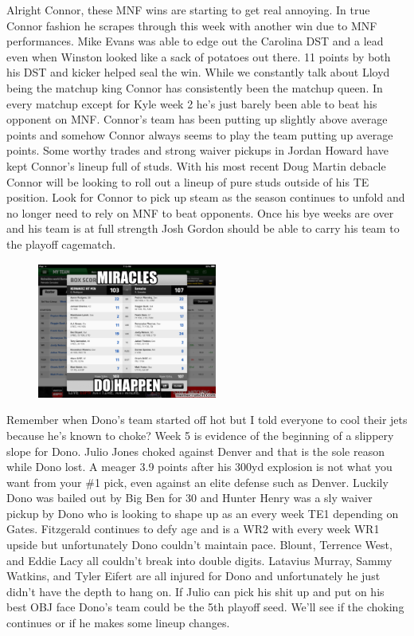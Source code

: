 \documentclass[11pt,letterpaper]{article}
\begin{document}
\newpage
{}
\par\noindent Alright Connor, these MNF wins are starting to get real annoying. In true Connor fashion he scrapes through this week with another win due to MNF performances.  Mike Evans was able to edge out the Carolina DST and a lead even when Winston looked like a sack of potatoes out there. 11 points by both his DST and kicker helped seal the win. While we constantly talk about Lloyd being the matchup king Connor has consistently been the matchup queen. In every matchup except for Kyle week 2 he's just barely been able to beat his opponent on MNF. Connor's team has been putting up slightly above average points and somehow Connor always seems to play the team putting up average points. Some worthy trades and strong waiver pickups in Jordan Howard have kept Connor's lineup full of studs. With his most recent Doug Martin debacle Connor will be looking to roll out a lineup of pure studs outside of his TE position. Look for Connor to pick up steam as the season continues to unfold and no longer need to rely on MNF to beat opponents. Once his bye weeks are over and his team is at full strength Josh Gordon should be able to carry his team to the playoff cagematch.
\begin{figure}
\centering
\includegraphics[width=0.525\textwidth]{week5-miracles.png}
\label{fig:week5-miracles}
\end{figure}
\bigskip
\par\noindent Remember when Dono's team started off hot but I told everyone to cool their jets because he's known to choke? Week 5 is evidence of the beginning of a slippery slope for Dono. Julio Jones choked against Denver and that is the sole reason while Dono lost. A meager 3.9 points after his 300yd explosion is not what you want from your \#1 pick, even against an elite defense such as Denver. Luckily Dono was bailed out by Big Ben for 30 and Hunter Henry was a sly waiver pickup by Dono who is looking to shape up as an every week TE1 depending on Gates.  Fitzgerald continues to defy age and is a WR2 with every week WR1 upside but unfortunately Dono couldn't maintain pace. Blount, Terrence West, and Eddie Lacy all couldn't break into double digits. Latavius Murray, Sammy Watkins, and Tyler Eifert are all injured for Dono and unfortunately he just didn't have the depth to hang on. If Julio can pick his shit up and put on his best OBJ face Dono's team could be the 5th playoff seed. We'll see if the choking continues or if he makes some lineup changes.
\end{document}
